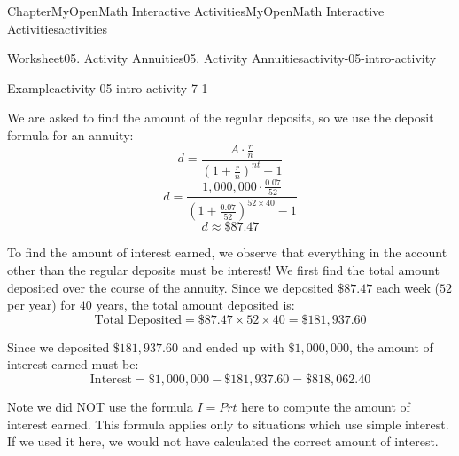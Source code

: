 \documentclass[oneside,10pt,]{book}
\newcommand{\blocktitlefont}{\relax}
\newcommand{\ptxlistdisc}{\raisebox{0.3ex}{\textbullet}}
\newlength{\fillinmaxwidth}
\newlength{\fillincontract}
\newlength{\charmaxwidth}\setlength{\charmaxwidth}{0.5em}
\newlength{\charminwidth}\setlength{\charminwidth}{0.1em}
\newlength{\fillinheight}
\newcommand{\fillintext}[1]{%
\setlength{\fillinmaxwidth}{#1\charmaxwidth}%
\setlength{\fillincontract}{#1\charminwidth}%
\setlength{\fillinheight}{\baselineskip}\addtolength{\fillinheight}{1.2pt}%
\strut\nobreak\leaders\vbox{\hrule width 0.3pt height 0.3pt \vskip -1.2pt}\hskip 1\fillinmaxwidth minus \fillincontract\nobreak\strut%
}
\begin{document}
\begin{chapterptx}{Chapter}{MyOpenMath Interactive Activities}{}{MyOpenMath Interactive Activities}{}{}{activities}
\begin{worksheet-section}{Worksheet}{05. Activity Annuities}{}{05. Activity Annuities}{}{}{activity-05-intro-activity}
\begin{example}{Example}{}{activity-05-intro-activity-7-1}
%
\par
We are asked to find the amount of the regular deposits, so we use the deposit formula for an annuity:%
\begin{equation*}
d = \frac{A \cdot \frac{r}{n}}{\left(1 + \frac{r}{n}\right)^{nt} - 1}
\end{equation*}
%
\begin{equation*}
d = \frac{1,000,000 \cdot \frac{0.07}{52}}{\left(1 + \frac{0.07}{52}\right)^{52 \times 40} - 1}
\end{equation*}
%
\begin{equation*}
d \approx \$87.47
\end{equation*}
%
\par
To find the amount of interest earned, we observe that everything in the account other than the regular deposits must be interest! We first find the total amount deposited over the course of the annuity. Since we deposited \(\$87.47\) each week (\(52\) per year) for \(40\) years, the total amount deposited is:%
\begin{equation*}
\text{Total Deposited} = \$87.47 \times 52 \times 40 = \$181,937.60
\end{equation*}
%
\par
Since we deposited \(\$181,937.60\) and ended up with \(\$1,000,000\), the amount of interest earned must be:%
\begin{equation*}
\text{Interest} = \$1,000,000 - \$181,937.60 = \$818,062.40
\end{equation*}
%
\par
Note we did NOT use the formula \(I = Prt\) here to compute the amount of interest earned. This formula applies only to situations which use simple interest. If we used it here, we would not have calculated the correct amount of interest.%
\end{example}
\end{worksheet-section}
\end{chapterptx}
\end{document}
